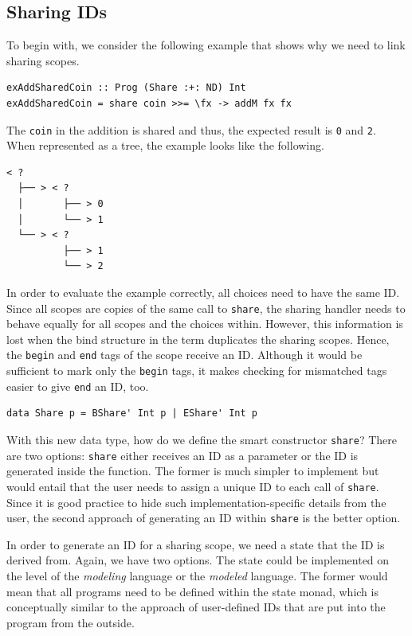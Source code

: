 \documentclass[a4paper, 11pt, fleqn, twoside, abstract=on]{scrreprt}
\newcommand{\hinl}[1]{\texttt{#1}}
\begin{document}
\subsection{Sharing IDs}
To begin with, we consider the following example that shows why we need to link sharing scopes.

\begin{verbatim}
exAddSharedCoin :: Prog (Share :+: ND) Int
exAddSharedCoin = share coin >>= \fx -> addM fx fx
\end{verbatim}
\noindent
The \hinl{coin} in the addition is shared and thus, the expected result is \hinl{0} and \hinl{2}.
When represented as a tree, the example looks like the following.

\begin{verbatim}
< ? 
  ├── > < ? 
  │       ├── > 0
  │       └── > 1
  └── > < ? 
          ├── > 1
          └── > 2
\end{verbatim}

In order to evaluate the example correctly, all choices need to have the same ID.
Since all scopes are copies of the same call to \hinl{share}, the sharing handler needs to behave equally for all scopes and the choices within.
However, this information is lost when the bind structure in the term duplicates the sharing scopes.
Hence, the \hinl{begin} and \hinl{end} tags of the scope receive an ID.
Although it would be sufficient to mark only the \hinl{begin} tags, it makes checking for mismatched tags easier to give \hinl{end} an ID, too.

\begin{verbatim}
data Share p = BShare' Int p | EShare' Int p
\end{verbatim}

With this new data type, how do we define the smart constructor \hinl{share}?
There are two options: \hinl{share} either receives an ID as a parameter or the ID is generated inside the function.
The former is much simpler to implement but would entail that the user needs to assign a unique ID to each call of \hinl{share}.
Since it is good practice to hide such implementation-specific details from the user, the second approach of generating an ID within \hinl{share} is the better option.

In order to generate an ID for a sharing scope, we need a state that the ID is derived from.
Again, we have two options.
The state could be implemented on the level of the \textit{modeling} language or the \textit{modeled} language.
The former would mean that all programs need to be defined within the state monad, which is conceptually similar to the approach of user-defined IDs that are put into the program from the outside.
\end{document}

